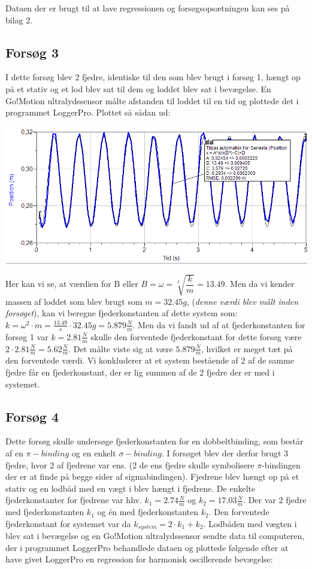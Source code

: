 Dataen der er brugt til at lave regressionen og forsøgsopsætningen kan ses på bilag 2.
\subsection{Forsøg 3}
I dette forsøg blev 2 fjedre, identiske til den som blev brugt i forsøg 1, hængt op på et stativ og et lod blev sat til dem og loddet blev sat i bevægelse. En Go!Motion ultralydssensor målte afstanden til loddet til en tid og plottede det i programmet LoggerPro. Plottet så sådan ud:

\begin{center}
\includegraphics[scale=0.7]{Billeder/graf3}
\end{center}

Her kan vi se, at værdien for B eller $B = \omega = \sqrt[2]{\dfrac{k}{m}}=13.49$. Men da vi kender massen af loddet som blev brugt som $m=32.45g$, (\emph{denne værdi blev målt inden forsøget}), kan vi beregne fjederkonstanten af dette system som:
$k=\omega^2 \cdot m = \frac{13.49}{s} \cdot 32.45g = 5.879 \frac{N}{m}$. Men da vi fandt ud af at fjederkonstanten for forsøg 1 var $k=2.81\frac{N}{m}$ skulle den forventede fjederkonstant for dette forsøg være $2 \cdot 2.81 \frac{N}{m}= 5.62 \frac{N}{m}$. Det målte viste sig at være $5.879 \frac{N}{m}$, hvilket er meget tæt på den forventede værdi. Vi konkluderer at et system bestående af 2 af de samme fjedre får en fjederkonstant, der er lig summen af de 2 fjedre der er med i systemet. 

\subsection{Forsøg 4}
Dette forsøg skulle undersøge fjederkonstanten for en dobbeltbinding, som består af en $\pi-binding$ og en enkelt $\sigma-binding$. I forsøget blev der derfor brugt 3 fjedre, hvor 2 af fjedrene var ens. (2 de ens fjedre skulle symbolisere $\pi$-bindingen der er at finde på begge sider af sigmabindingen). Fjedrene blev hængt op på et stativ og en lodbåd med en vægt i blev hængt i fjedrene. De enkelte fjederkonstanter for fjedrene var hhv. $k_1 = 2.74\frac{N}{m}$ og $k_2=17.03 \frac{N}{m}$. Der var 2 fjedre med fjederkonstanten $k_1$ og én med fjederkonstanten $k_2$. Den forventede fjederkonstant for systemet var da $k_{system}= 2 \cdot k_1 + k_2$. Lodbåden med vægten i blev sat i bevægelse og en Go!Motion ultralydssensor sendte data til computeren, der i programmet LoggerPro behandlede dataen og plottede følgende efter at have givet LoggerPro en regression for harmonisk oscillerende bevægelse:


